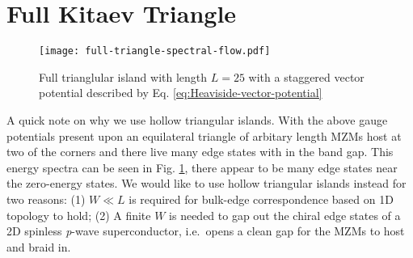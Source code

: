\section{Full Kitaev Triangle}

\begin{figure}[here]
  \texttt{[image: full-triangle-spectral-flow.pdf]}
  \caption{Full trianglular island with length $L=25$ with a staggered vector potential described by Eq. \ref{eq:Heaviside-vector-potential}}
  \label{fig:full-triangle-energy}
\end{figure}


A quick note on why we use hollow triangular islands.
With the above gauge potentials present upon an equilateral triangle of arbitary length MZMs host at two of the corners and there live many edge states with in the band gap.
This energy spectra can be seen in Fig. \ref{fig:full-triangle-energy}, there appear to be many edge states near the zero-energy states.
We would like to use hollow triangular islands instead for two reasons: (1) $W \ll L$ is required for bulk-edge correspondence based on 1D topology to hold; (2) A finite $W$ is needed to gap out the chiral edge states of a 2D spinless \textit{p}-wave superconductor, i.e.\ opens a clean gap for the MZMs to host and braid in.


